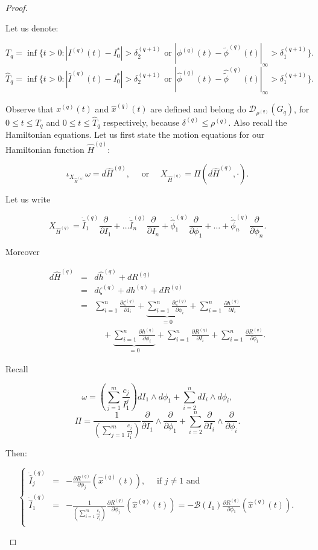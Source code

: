 \begin{proof}
\begin{enumerate}
Let us denote:


$ T_q = \inf\{t>0: | I^{(q)}(t) - I_0^* | > \delta_2^{(q+1)} \text{ or } | \phi^{(q)}(t) - {\tilde \phi}^{(q)}(t)|_\infty > \delta_1^{(q+1)}\}.$
$\hat T_q = \inf\{t>0: |\hat I^{(q)}(t) - I_0^* | > \delta_2^{(q+1)} \text{ or } |\hat \phi^{(q)}(t) - \hat{\tilde \phi}^{(q)}(t)|_\infty > \delta_1^{(q+1)}\}.$

Observe that $x^{(q)}(t)$ and $\hat x^{(q)}(t)$ are defined and belong do $\mathcal{D}_{\rho^{(q)}}(G_q)$, for $0\leq t\leq T_q$ and $0\leq t \leq \hat T_q$ respectively, because $\delta^{(q)} \leq \rho^{(q)}$. Also recall the Hamiltonian equations. Let us first state the motion equations for our Hamiltonian function $\hat H^{(q)}$:

$$ \iota_{X_{\hat H^{(q)}}} \omega = d\hat H^{(q)} , \quad \text{ or } \quad X_{\hat H^{(q)}}  = \Pi(d \hat H^{(q)}, \cdot).$$

Let us write

$$X_{\hat H^{(q)}} = \dot{\hat{I}}_1^{(q)}\frac{\partial}{\partial I_1} + \ldots \dot{\hat{I}}_n^{(q)}\frac{\partial}{\partial I_n} + \dot{\hat{\phi}}_1^{(q)}\frac{\partial}{\partial \phi_1} + \ldots + \dot{\hat{\phi}}_n^{(q)}\frac{\partial}{\partial \phi_n}.$$

Moreover

$$
\begin{array}{rcl}
d \hat H^{(q)} & = & d \hat h^{(q)} + dR^{(q)} \\
 & = & d\zeta^{(q)} + dh^{(q)} + dR^{(q)} \\
 & = & \sum_{i=1}^n \frac{\partial \zeta^{(q)}}{\partial I_i} +
\underbrace{\sum_{i=1}^n \frac{\partial \zeta^{(q)}}{\partial \phi_i}}_{=0} +
\sum_{i=1}^n \frac{\partial h^{(q)}}{\partial I_i} \\
&& \quad +
\underbrace{\sum_{i=1}^n \frac{\partial h^{(q)}}{\partial \phi_i}}_{=0} +
\sum_{i=1}^n \frac{\partial R^{(q)}}{\partial I_i} +
\sum_{i=1}^n \frac{\partial R^{(q)}}{\partial \phi_i}.
\end{array}
$$

Recall

$$\omega = \left(\sum_{j=1}^m\frac{c_j}{I_1^j}\right)dI_1\wedge d\phi_1 + \sum_{i=2}^{n} dI_i \wedge d\phi_i, $$
$$ \Pi = \frac{1}{\left(\sum_{j=1}^{m}\frac{c_j}{I_1^J}\right)}\frac{\partial}{\partial I_1} \wedge \frac{\partial}{\partial \phi_1} + \sum_{i=2}^{n} \frac{\partial}{\partial I_i}\wedge\frac{\partial}{\partial \phi_i}.$$

Then:

$$
\left\{
\begin{array}{rcl}
 \dot{\hat{I}}_j^{(q)}  & = &  -\frac{\partial R^{(q)}}{\partial \phi_j}(\hat x^{(q)}(t)), \quad \text{ if }  j \neq 1 \text{ and }\\
 \dot{\hat{I}}_1^{(q)} & = & -\frac{1}{\left(\sum_{i=1}^{m}\frac{c_i}{I_1^i}\right)}\frac{\partial R^{(q)}}{\partial \phi_j}(\hat x^{(q)}(t)) = -\mathcal{B}(I_1) \frac{\partial R^{(q)}}{\partial \phi_1}(\hat x^{(q)}(t)).\\
\end{array}
\right.
$$


\end{enumerate}
\end{proof}
